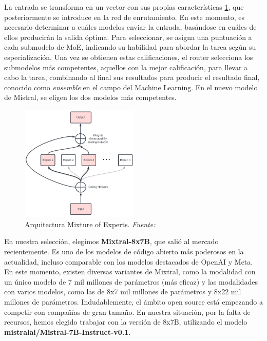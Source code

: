 \bigskip %

La entrada se transforma en un vector con sus propias características \ref{fig:5_MIXTRAL_MoE}, que posteriormente se introduce en la red de enrutamiento. En este momento, es necesario determinar a cuáles modelos enviar la entrada, basándose en cuáles de ellos producirán la salida óptima. Para seleccionar, se asigna una puntuación a cada submodelo de \acrshort{MoE}, indicando su habilidad para abordar la tarea según su especialización. Una vez se obtienen estas calificaciones, el router selecciona los submodelos más competentes, aquellos con la mejor calificación, para llevar a cabo la tarea, combinando al final sus resultados para producir el resultado final, conocido como \textit{ensemble} en el campo del Machine Learning. En el nuevo modelo de Mistral, se eligen los dos modelos más competentes.

\bigskip %


\begin{figure}[ht!]
  \centering
  \includegraphics[width=0.5\textwidth, keepaspectratio]{imaxes/5_MIXTRAL_MoE.jpg}
  \caption[Arquitectura Mixture of Experts]{Arquitectura Mixture of Experts. \textit{Fuente: \cite{Elmo2024Mixtral}}}
  \label{fig:5_MIXTRAL_MoE}
\end{figure}



\bigskip %

En nuestra selección, elegimos \textbf{Mixtral-8x7B}, que salió al mercado recientemente. Es uno de los modelos de código abierto más poderosos en la actualidad, incluso comparable con los modelos destacados de OpenAI y Meta. En este momento, existen diversas variantes de Mixtral, como la modalidad con un único modelo de 7 mil millones de parámetros (más eficaz) y las modalidades con varios modelos, como las de 8x7 mil millones de parámetros y 8x22 mil millones de parámetros. Indudablemente, el ámbito open source está empezando a competir con compañías de gran tamaño. En nuestra situación, por la falta de recursos, hemos elegido trabajar con la versión de 8x7B, utilizando el modelo \textbf{mistralai/Mistral-7B-Instruct-v0.1}.

